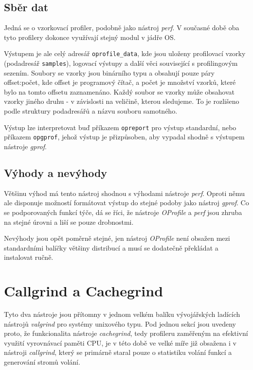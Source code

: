 \documentclass[czech,BP]{thesiskiv}
\begin{document}
\subsection*{Sběr dat}

Jedná se o vzorkovací profiler, podobně jako nástroj \emph{perf}. V současné době oba tyto profilery dokonce využívají stejný modul v jádře OS.

Výstupem je ale celý adresář \texttt{oprofile\_data}, kde jsou uloženy profilovací vzorky (podadresář \texttt{samples}), logovací výstupy a další věci související s profilingovým sezením. Soubory se vzorky jsou binárního typu a obsahují pouze páry offset:počet, kde offset je programový čítač, a počet je množství vzorků, které bylo na tomto offsetu zaznamenáno. Každý soubor se vzorky může obsahovat vzorky jiného druhu - v závislosti na veličině, kterou sledujeme. To je rozlišeno podle struktury podadresářů a názvu souboru samotného.

Výstup lze interpretovat buď příkazem \texttt{opreport} pro výstup standardní, nebo příkazem \texttt{opgprof}, jehož výstup je přizpůsoben, aby vypadal shodně s výstupem nástroje \emph{gprof}.

\subsection*{Výhody a nevýhody}

Většinu výhod má tento nástroj shodnou s výhodami nástroje \emph{perf}. Oproti němu ale disponuje možností formátovat výstup do stejné podoby jako nástroj \emph{gprof}. Co se podporovaných funkcí týče, dá se říci, že nástroje \emph{OProfile} a \emph{perf} jsou zhruba na stejné úrovni a liší se pouze drobnostmi.

Nevýhody jsou opět poměrně stejné, jen nástroj \emph{OProfile} není obsažen mezi standardními balíčky většiny distribucí a musí se dodatečně překládat a instalovat ručně.




\section{Callgrind a Cachegrind}

Tyto dva nástroje jsou přítomny v jednom velkém balíku vývojářských ladících nástrojů \emph{valgrind} pro systémy unixového typu. Pod jednou sekcí jsou uvedeny proto, že funkcionalita nástroje \emph{cachegrind}, tedy profileru zaměřeným na efektivní využití vyrovnávací paměti CPU, je v této době ve velké míře již obsažena i v nástroji \emph{callgrind}, který se primárně staral pouze o statistiku volání funkcí a generování stromů volání.
\end{document}
